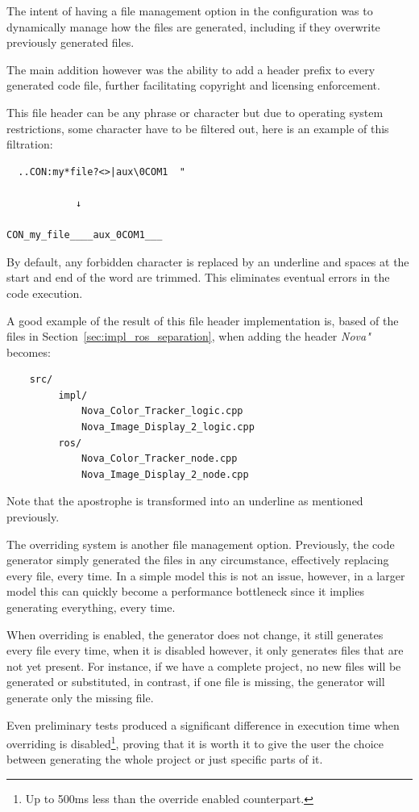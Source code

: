 The intent of having a file management option in the configuration was to dynamically manage how the files are generated, including if they overwrite previously generated files.

The main addition however was the ability to add a header prefix to every generated code file, further facilitating copyright and licensing enforcement.

This file header can be any phrase or character but due to operating system restrictions, some character have to be filtered out, here is an example of this filtration:

\begin{verbatim}
  ..CON:my*file?<>|aux\0COM1  "

			↓

CON_my_file____aux_0COM1___
\end{verbatim}

By default, any forbidden character is replaced by an underline and spaces at the start and end of the word are trimmed. This eliminates eventual errors in the code execution.

A good example of the result of this file header implementation is, based of the files in Section~\ref{sec:impl_ros_separation}, when adding the header \textit{Nova"} becomes:

\begin{verbatim}
	src/
		 impl/
			 Nova_Color_Tracker_logic.cpp
			 Nova_Image_Display_2_logic.cpp
		 ros/
			 Nova_Color_Tracker_node.cpp
			 Nova_Image_Display_2_node.cpp
\end{verbatim}

Note that the apostrophe is transformed into an underline as mentioned previously.

The overriding system is another file management option. Previously, the code generator simply generated the files in any circumstance, effectively replacing every file, every time. In a simple model this is not an issue, however, in a larger model this can quickly become a performance bottleneck since it implies generating everything, every time. 

When overriding is enabled, the generator does not change, it still generates every file every time, when it is disabled however, it only generates files that are not yet present. For instance, if we have a complete project, no new files will be generated or substituted, in contrast, if one file is missing, the generator will generate only the missing file.

Even preliminary tests produced a significant difference in execution time when overriding is disabled\footnote{Up to 500ms less than the override enabled counterpart.}, proving that it is worth it to give the user the choice between generating the whole project or just specific parts of it.

